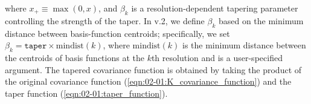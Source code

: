 \documentclass[article]{jss}
\def\mbf#1{{%
\mathchoice%
{\hbox{\boldmath$\displaystyle{#1}$}}%
{\hbox{\boldmath$\textstyle{#1}$}}%
{\hbox{\boldmath$\scriptstyle{#1}$}}%
{\hbox{\boldmath$\scriptscriptstyle{#1}$}}%
}}
\def\vec{\mbf}
\begin{document}
\begin{appendix}
\begin{equation}
\end{equation}
where $x_{+} \equiv \max(0, x)$, and $\beta_k$ is a resolution-dependent tapering parameter controlling the strength of the taper. 
In  v.2, we define $\beta_k$ based on the minimum distance between basis-function centroids; specifically, we set $\beta_k = \texttt{taper} \times \text{mindist}(k)$, where $\text{mindist}(k)$ is the minimum distance between the centroids of basis functions at the $k$th resolution and  is a user-specified argument.
The tapered covariance function is obtained by taking the product of the original covariance function (\ref{eqn:02-01:K_covariance_function}) and the taper function (\ref{eqn:02-01:taper_function}).%




\end{appendix}
\end{document}
